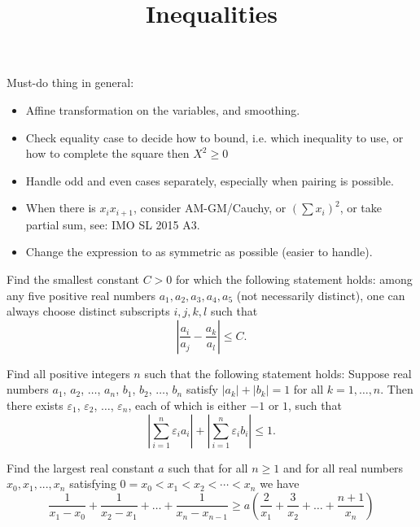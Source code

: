 \documentclass[11pt]{scrartcl}
\begin{document}
\title{Inequalities}
\maketitle

Must-do thing in general:
\begin{itemize}
    \item Affine transformation on the variables, and smoothing.
    \item Check equality case to decide how to bound, i.e. which inequality to use, or how to complete the square then $X^2 \ge 0$
    \item Handle odd and even cases separately, especially when pairing is possible.
    \item When there is $x_ix_{i+1}$, consider AM-GM/Cauchy, or $(\sum x_i)^2$, or take partial sum, see: IMO SL 2015 A3.
    \item Change the expression to as symmetric as possible (easier to handle).
\end{itemize}

\tableofcontents




\clearpage


\begin{Problem}
Find the smallest constant $C > 0$ for which the following statement holds: among any five positive real numbers $a_1,a_2,a_3,a_4,a_5$ (not necessarily distinct), one can always choose distinct subscripts $i,j,k,l$ such that
\[ \left| \frac{a_i}{a_j} - \frac {a_k}{a_l} \right| \le C. \]
\end{Problem}




\begin{Problem}
Find all positive integers $n$ such that the following statement holds: Suppose real numbers $a_1$, $a_2$, $\dots$, $a_n$, $b_1$, $b_2$, $\dots$, $b_n$ satisfy $|a_k|+|b_k|=1$ for all $k=1,\dots,n$. Then there exists $\varepsilon_1$, $\varepsilon_2$, $\dots$, $\varepsilon_n$, each of which is either $-1$ or $1$, such that
\[ \left| \sum_{i=1}^n \varepsilon_i a_i \right| + \left| \sum_{i=1}^n \varepsilon_i b_i \right| \le 1. \]
\end{Problem}




\begin{Problem}
Find the largest real constant $a$ such that for all $n \geq 1$ and for all real numbers $x_0, x_1, ... , x_n$ satisfying $0 = x_0 < x_1 < x_2 < \cdots < x_n$ we have
\[\frac{1}{x_1-x_0} + \frac{1}{x_2-x_1} + \dots + \frac{1}{x_n-x_{n-1}} \geq a \left( \frac{2}{x_1} + \frac{3}{x_2} + \dots + \frac{n+1}{x_n} \right)\]
\end{Problem}
\end{document}
